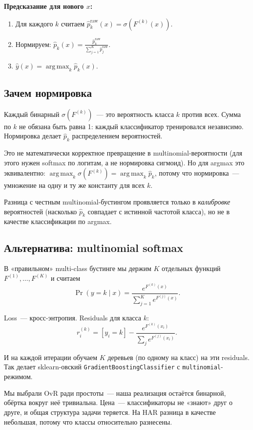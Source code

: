 \documentclass[12pt,a4paper]{article}
\newcommand{\argmax}{\operatorname{arg\,max}}
\begin{document}
\textbf{Предсказание для нового $x$:}
\begin{enumerate}
  \item Для каждого $k$ считаем $\hat{p}_k^{\text{raw}}(x) = \sigma(F^{(k)}(x))$.
  \item Нормируем: $\displaystyle \hat{p}_k(x) = \frac{\hat{p}_k^{\text{raw}}}{\sum_{j=1}^K \hat{p}_j^{\text{raw}}}$.
  \item $\hat{y}(x) = \argmax_k \hat{p}_k(x)$.
\end{enumerate}

\subsection{Зачем нормировка}

Каждый бинарный $\sigma(F^{(k)})$~--- это вероятность класса $k$ против всех. Сумма по $k$ не обязана быть равна 1: каждый классификатор тренировался независимо. Нормировка делает $\hat{p}_k$ распределением вероятностей.

\begin{warning}
Это не математически корректное превращение в multinomial-вероятности (для этого нужен softmax по логитам, а не нормировка сигмоид). Но для argmax это эквивалентно: $\argmax_k \sigma(F^{(k)}) = \argmax_k \hat{p}_k$, потому что нормировка~--- умножение на одну и ту же константу для всех $k$.

Разница с честным multinomial-бустингом проявляется только в \emph{калибровке} вероятностей (насколько $\hat{p}_k$ совпадает с истинной частотой класса), но не в качестве классификации по argmax.
\end{warning}

\subsection{Альтернатива: multinomial softmax}

В «правильном» multi-class бустинге мы держим $K$ отдельных функций $F^{(1)}, \ldots, F^{(K)}$ и считаем
\[
  \Pr(y = k \mid x) = \frac{e^{F^{(k)}(x)}}{\sum_{j=1}^K e^{F^{(j)}(x)}}.
\]

Loss~--- кросс-энтропия. Residuals для класса $k$:
\[
  r_i^{(k)} = [y_i = k] - \frac{e^{F^{(k)}(x_i)}}{\sum_j e^{F^{(j)}(x_i)}}.
\]

И на каждой итерации обучаем $K$ деревьев (по одному на класс) на эти residuals. Так делает sklearn-овский \texttt{GradientBoostingClassifier} с \texttt{multinomial}-режимом.

Мы выбрали OvR ради простоты~--- наша реализация остаётся бинарной, обёртка вокруг неё тривиальна. Цена~--- классификаторы не «знают» друг о друге, и общая структура задачи теряется. На HAR разница в качестве небольшая, потому что классы относительно разнесены.
\end{document}
